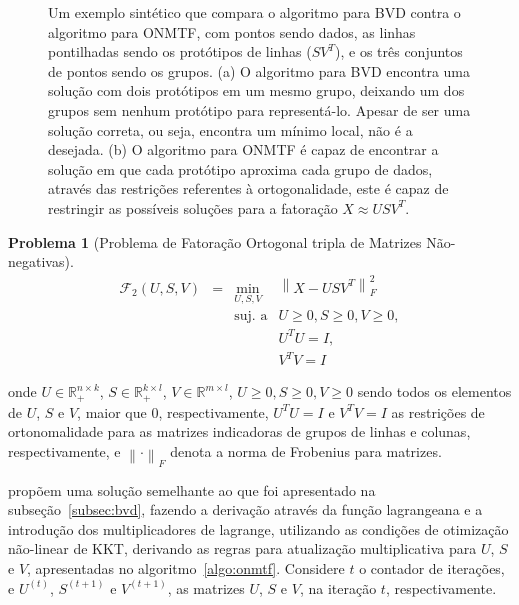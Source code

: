 \documentclass[
    12pt,                %
    oneside,            %
    a4paper,            %
    english,            %
    brazil                %
    ]{abntex2ppgsi}
\newtheorem{problem}{Problema}
\newcommand{\norm}[1]{\left\lVert#1\right\rVert}
\begin{document}
\begin{figure}
\begin{subfigure}[b]{0.35\textwidth}
        \caption{}
        \label{fig:bvdvsonmtf:2}
    \end{subfigure}
    \caption{
        Um exemplo sintético que compara o algoritmo para BVD contra o algoritmo para ONMTF, com pontos sendo dados, as linhas pontilhadas sendo os protótipos de linhas ($S V^T$), e os três conjuntos de pontos sendo os grupos.
        (a) O algoritmo para BVD encontra uma solução com dois protótipos em um mesmo grupo, deixando um dos grupos sem nenhum protótipo para representá-lo.
        Apesar de ser uma solução correta, ou seja, encontra um mínimo local, não é a desejada.
        (b) O algoritmo para ONMTF é capaz de encontrar a solução em que cada protótipo aproxima cada grupo de dados, através das restrições referentes à ortogonalidade, este é capaz de restringir as possíveis soluções para a fatoração $X \approx U S V^T$.
        \cite{Yoo2010}
    }
    \label{fig:bvdvsonmtf}
\end{figure}

\begin{problem}[Problema de Fatoração Ortogonal tripla de Matrizes Não-negativas]
\label{def:onmtf:problem}
\begin{equation}
    \begin{array}{lclcl}
        \displaystyle \mathcal{F}_2(U, S, V) & = & \displaystyle \min_{U, S, V} & \norm{X - USV^T}^{2}_{F}      \\
                                             &   & \text{suj. a}                & U \geq 0, S \geq 0, V \geq 0, \\
                                             &   &                              & U^T U = I,                    \\
                                             &   &                              & V^T V = I
    \end{array}
\end{equation}
\end{problem}

onde $U \in \mathbb{R}^{n \times k}_{+}$, $S \in \mathbb{R}^{k \times l}_{+}$, $V \in \mathbb{R}^{m \times l}$, $U \geq 0, S \geq 0, V \geq 0$ sendo todos os elementos de $U$, $S$ e $V$, maior que $0$, respectivamente, $U^T U = I$ e $V^T V = I$ as restrições de ortonomalidade para as matrizes indicadoras de grupos de linhas e colunas, respectivamente, e $\norm{\cdot}_F$ denota a norma de Frobenius para matrizes.

 propõem uma solução semelhante ao que foi apresentado na subseção~\ref{subsec:bvd}, fazendo a derivação através da função lagrangeana e a introdução dos multiplicadores de lagrange, utilizando as condições de otimização não-linear de KKT, derivando as regras para atualização multiplicativa para $U$, $S$ e $V$, apresentadas no algoritmo~\ref{algo:onmtf}.
Considere $t$ o contador de iterações, e $U^{(t)}$, $S^{(t+1)}$ e $V^{(t+1)}$, as matrizes $U$, $S$ e $V$, na iteração $t$, respectivamente.
\end{document}
